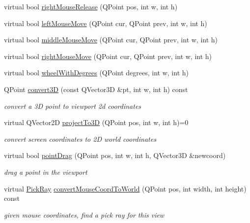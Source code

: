\begin{DoxyCompactItemize}
virtual bool \hyperlink{classShipCAD_1_1ViewportView_aaeff27f9b32dc7ee98dbfc14b7eca804}{right\+Mouse\+Release} (Q\+Point pos, int w, int h)
\item 
virtual bool \hyperlink{classShipCAD_1_1ViewportView_a2dc46f8d032d707308cf853c70bc965a}{left\+Mouse\+Move} (Q\+Point cur, Q\+Point prev, int w, int h)
\item 
virtual bool \hyperlink{classShipCAD_1_1ViewportView_a44baf7aad8a3ba7ded04395a8765caf9}{middle\+Mouse\+Move} (Q\+Point cur, Q\+Point prev, int w, int h)
\item 
virtual bool \hyperlink{classShipCAD_1_1ViewportView_a537210f7c2872e7b8921341660e85347}{right\+Mouse\+Move} (Q\+Point cur, Q\+Point prev, int w, int h)
\item 
virtual bool \hyperlink{classShipCAD_1_1ViewportView_a77ce1c6a0216a791ee2ae79dd6674cde}{wheel\+With\+Degrees} (Q\+Point degrees, int w, int h)
\item 
Q\+Point \hyperlink{classShipCAD_1_1ViewportView_ac763be6de52b393cb0b9ff4be4c66fcf}{convert3D} (const Q\+Vector3D \&pt, int w, int h) const 
\begin{DoxyCompactList}\small\item\em convert a 3D point to viewport 2d coordinates \end{DoxyCompactList}\item 
virtual Q\+Vector2D \hyperlink{classShipCAD_1_1ViewportView_a2bc94791273d6134566a386f2a735e37}{project\+To3D} (Q\+Point pos, int w, int h)=0
\begin{DoxyCompactList}\small\item\em convert screen coordinates to 2D world coordinates \end{DoxyCompactList}\item 
virtual bool \hyperlink{classShipCAD_1_1ViewportView_a6991b6b121b609ec7d18518a8f872859}{point\+Drag} (Q\+Point pos, int w, int h, Q\+Vector3D \&newcoord)
\begin{DoxyCompactList}\small\item\em drag a point in the viewport \end{DoxyCompactList}\item 
virtual \hyperlink{structShipCAD_1_1PickRay}{Pick\+Ray} \hyperlink{classShipCAD_1_1ViewportView_a845fc1fe9fa6ec52726fba1ad350e638}{convert\+Mouse\+Coord\+To\+World} (Q\+Point pos, int width, int height) const 
\begin{DoxyCompactList}\small\item\em given mouse coordinates, find a pick ray for this view \end{DoxyCompactList}\end{DoxyCompactItemize}
